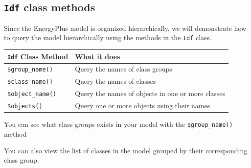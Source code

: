 \documentclass[
]{book}
\newenvironment{Shaded}{\begin{snugshade}}{\end{snugshade}}
\newcommand{\DocumentationTok}[1]{\textcolor[rgb]{0.56,0.35,0.01}{\textbf{\textit{#1}}}}
\newcommand{\FunctionTok}[1]{\textcolor[rgb]{0.00,0.00,0.00}{#1}}
\newcommand{\NormalTok}[1]{#1}
\newcommand{\SpecialCharTok}[1]{\textcolor[rgb]{0.00,0.00,0.00}{#1}}
\begin{document}
\hypertarget{idf-class-methods}{%
\subsection{\texorpdfstring{\texttt{Idf} class methods}{Idf class methods}}\label{idf-class-methods}}

Since the EnergyPlus model is organized hierarchically, we will demonstrate how to query the model hierarchically using the methods in the \texttt{Idf} class.

\begin{longtable}[]{@{}ll@{}}
\toprule
\texttt{Idf} Class Method & What it does \\
\midrule
\endhead
\texttt{\$group\_name()} & Query the names of class groups \\
\texttt{\$class\_name()} & Query the names of classes \\
\texttt{\$object\_name()} & Query the names of objects in one or more classes \\
\texttt{\$objects()} & Query one or more objects using their names \\
\bottomrule
\end{longtable}

You can see what class groups exists in your model with the \texttt{\$group\_name()} method

\begin{Shaded}
\end{Shaded}

You can also view the list of classes in the model grouped by their corresponding class group.
\end{document}
